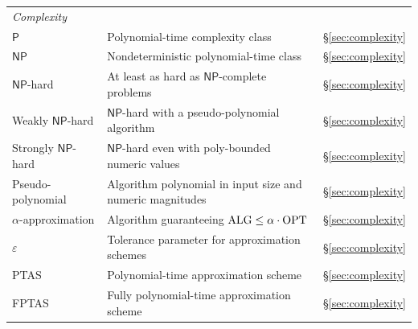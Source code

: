 \begin{longtable}{@{}l>{\raggedright\arraybackslash}p{}l@{}}
\multicolumn{3}{l}{\textit{Complexity}} \\
$\mathsf{P}$ & Polynomial-time complexity class & \S\ref{sec:complexity} \\
$\mathsf{NP}$ & Nondeterministic polynomial-time class & \S\ref{sec:complexity} \\
$\mathsf{NP}$-hard & At least as hard as $\mathsf{NP}$-complete problems & \S\ref{sec:complexity} \\
Weakly $\mathsf{NP}$-hard & $\mathsf{NP}$-hard with a pseudo-polynomial algorithm & \S\ref{sec:complexity} \\
Strongly $\mathsf{NP}$-hard & $\mathsf{NP}$-hard even with poly-bounded numeric values & \S\ref{sec:complexity} \\
Pseudo-polynomial & Algorithm polynomial in input size and numeric magnitudes & \S\ref{sec:complexity} \\
$\alpha$-approximation & Algorithm guaranteeing $\mathrm{ALG} \leq \alpha \cdot \mathrm{OPT}$ & \S\ref{sec:complexity} \\
$\varepsilon$ & Tolerance parameter for approximation schemes & \S\ref{sec:complexity} \\
PTAS & Polynomial-time approximation scheme & \S\ref{sec:complexity} \\
FPTAS & Fully polynomial-time approximation scheme & \S\ref{sec:complexity} \\

\end{longtable}

